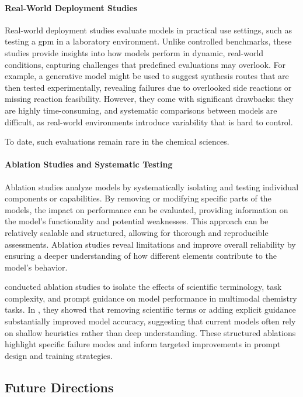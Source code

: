 \paragraph{Real-World Deployment Studies} 
Real-world deployment studies evaluate models in practical use settings, such as testing a \gls{gpm} in a laboratory environment. \autocite{he2020deployment}
Unlike controlled benchmarks, these studies provide insights into how models perform in dynamic, real-world conditions, capturing challenges that predefined evaluations may overlook. 
For example, a generative model might be used to suggest synthesis routes that are then tested experimentally, revealing failures due to overlooked side reactions or missing reaction feasibility. However, they come with significant drawbacks: they are highly time-consuming, and systematic comparisons between models are difficult, as real-world environments introduce variability that is hard to control. 

To date, such evaluations remain rare in the chemical sciences. 


\paragraph{Ablation Studies and Systematic Testing} 
Ablation studies analyze models by systematically isolating and testing individual components or capabilities. 
By removing or modifying specific parts of the models, the impact on performance can be evaluated, providing information on the model’s functionality and potential weaknesses. This approach can be relatively scalable and structured, allowing for thorough and reproducible assessments. Ablation studies reveal limitations and improve overall reliability by ensuring a deeper understanding of how different elements contribute to the model’s behavior. 

\textcite{alampara2024probing} conducted ablation studies to isolate the effects of scientific terminology, task complexity, and prompt guidance on model performance in multimodal chemistry tasks. 
In , they showed that removing scientific terms or adding explicit guidance substantially improved model accuracy, suggesting that current models often rely on shallow heuristics rather than deep understanding. These structured ablations highlight specific failure modes and inform targeted improvements in prompt design and training strategies.

\subsection{Future Directions}

